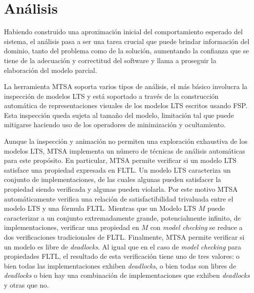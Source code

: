 \section{Análisis}

Habiendo construido una aproximación inicial del comportamiento esperado del sistema, el análisis pasa a ser una tarea
crucial que puede brindar información del dominio, tanto del problema como de la solución, aumentando la confianza que se
tiene de la adecuación y correctitud del software y llama a proseguir la elaboración del modelo parcial. 

La herramienta MTSA soporta varios tipos de análisis, el más básico involucra la inspección de modelos LTS y está
soportado a través de la construcción automática de representaciones visuales de los modelos LTS escritos usando FSP.
Esta inspección queda sujeta al tamaño del modelo, limitación tal que puede mitigarse haciendo uso de los operadores de
minimización y ocultamiento.

Aunque la inspección y animación no permiten una exploración exhaustiva de los modelos LTS, MTSA implementa un número de
técnicas de análisis automáticas para este propósito. En particular, MTSA permite verificar si un modelo LTS satisface
una propiedad expresada en FLTL. Un modelo LTS caracteriza un conjunto de implementaciones, de las cuales algunas pueden
satisfacer la propiedad siendo verificada y algunas pueden violarla. Por este motivo MTSA automáticamente verifica una
relación de satisfactibilidad trivaluada entre el modelo LTS y una fórmula FLTL. Mientras que un Modelo LTS $M$ puede
caracterizar a un conjunto extremadamente grande, potencialmente infinito, de implementaciones, verificar una propiedad
en $M$ con \emph{model checking} se reduce a dos verificaciones tradicionales de FLTL. Finalmente, MTSA permite verificar si un
modelo es libre de \emph{deadlocks}. Al igual que en el caso de \emph{model checking} para propiedades FLTL, el
resultado de esta verificación tiene uno de tres valores: o bien todas las implementaciones exhiben \emph{deadlocks}, o
bien todas son libres de \emph{deadlocks} o bien hay una combinación de implementaciones que exhiben \emph{deadlocks} y
otras que no.
